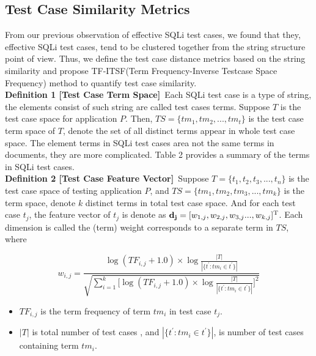\documentclass{sig-alternate}
\begin{document}
\subsection{Test Case Similarity Metrics}
From our previous observation of effective SQLi test cases, we found that they, effective SQLi test cases, tend to be clustered together from the string structure point of view. Thus, we define the test case distance metrics based on the string similarity and propose TF-ITSF(Term Frequency-Inverse Testcase Space Frequency) method to quantify test case similarity.\\ 

{\bf Definition 1 [Test Case Term Space]}~Each SQLi test case is a type of string, the elements consist of such string are called test cases terms. Suppose $T$ is the test case space for application $P$. Then, $TS = \{tm_{1},tm_{2},...,tm_{t}\}$ is the test case term space of $T$, denote the set of all distinct terms appear in whole test case space. The element terms in SQLi test cases area not the same terms in documents, they are more complicated. Table 2 provides a summary of the terms in SQLi test cases.\\








{\bf Definition 2 [Test Case Feature Vector]}~Suppose $T = \{t_{1}, t_{2}, t_{3},...,  t_{n}\}$ is the test case space of testing application $P$, and $TS = \{tm_{1}, tm_{2}, tm_{3},..., tm_{k}\}$ is the term space, denote $k$ distinct terms in total test case space. And for each test case $t_{j}$, the feature vector of $t_{j}$ is denote as  ${\bf  d_{j}} = [{w_{1,j}, w_{2,j}, w_{3,j} ... , w_{k,j}]^\mathrm{T}}$. Each dimension is called the (term) weight corresponds to a separate term in $TS$, where 

\begin{equation}w_{i,j} = \frac { \log{(TF_{i,j} + 1.0)} \times \log \frac{|T|}{|\{t^{'} : tm_i \in t^{'}\}|} }
{\sqrt{ \sum_{i=1}^{k} \lbrack \log{(TF_{i,j} + 1.0)} \times \log \frac{|T|}{|\{t^{'} : tm_i \in t^{'}\}|}\rbrack ^{2} }}
\end{equation}


\begin{itemize}
\item $TF_{i,j}$ is the term frequency of term $tm_{i}$ in test case $t_{j}$.
\item $|T|$ is total number of test cases , and ${|\{t^{'} : tm_i \in t^{'}\}|}$, is number of test cases containing term $tm_{i}$.
\end{itemize} 
\end{document}
